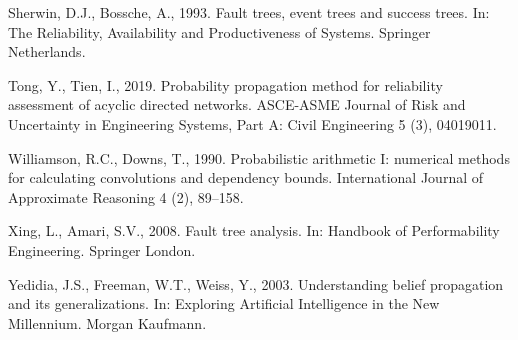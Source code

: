 \documentclass[preprint,12pt]{elsarticle}
\theoremstyle{definition}
\begin{document}
Sherwin, D.J., Bossche, A., 1993. Fault trees, event trees and success trees. In: The Reliability,
Availability and Productiveness of Systems. Springer Netherlands.

Tong, Y., Tien, I., 2019. Probability propagation method for reliability assessment of acyclic directed
networks. ASCE-ASME Journal of Risk and Uncertainty in Engineering Systems, Part A: Civil Engineering 5
(3), 04019011.

Williamson, R.C., Downs, T., 1990. Probabilistic arithmetic I: numerical methods for calculating
convolutions and dependency bounds. International Journal of Approximate Reasoning 4 (2), 89--158.

Xing, L., Amari, S.V., 2008. Fault tree analysis. In: Handbook of Performability Engineering. Springer
London.

Yedidia, J.S., Freeman, W.T., Weiss, Y., 2003. Understanding belief propagation and its
generalizations. In: Exploring Artificial Intelligence in the New Millennium. Morgan Kaufmann.

\endgroup
\end{document}
